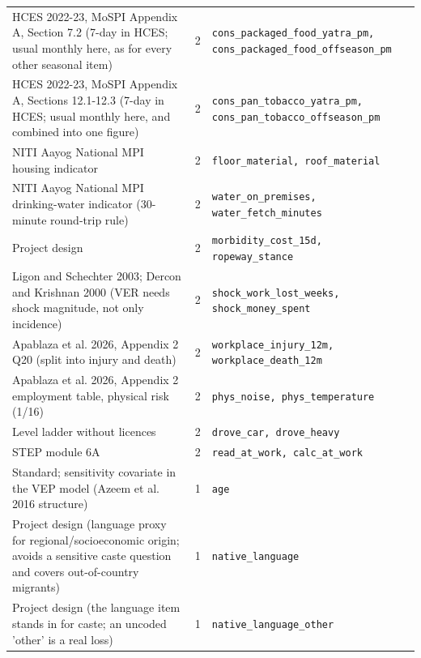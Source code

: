 \documentclass[9pt,a4paper,landscape]{article}
\begin{document}
\begin{longtable}{@{}p{9.5cm}p{1.2cm}p{12.5cm}@{}}
\scriptsize HCES 2022-23, MoSPI Appendix A, Section 7.2 (7-day in HCES; usual monthly here, as for every other seasonal item) & \scriptsize 2 & \scriptsize\texttt{cons\_packaged\_food\_yatra\_pm, cons\_packaged\_food\_offseason\_pm}\\
\scriptsize HCES 2022-23, MoSPI Appendix A, Sections 12.1-12.3 (7-day in HCES; usual monthly here, and combined into one figure) & \scriptsize 2 & \scriptsize\texttt{cons\_pan\_tobacco\_yatra\_pm, cons\_pan\_tobacco\_offseason\_pm}\\
\scriptsize NITI Aayog National MPI housing indicator & \scriptsize 2 & \scriptsize\texttt{floor\_material, roof\_material}\\
\scriptsize NITI Aayog National MPI drinking-water indicator (30-minute round-trip rule) & \scriptsize 2 & \scriptsize\texttt{water\_on\_premises, water\_fetch\_minutes}\\
\scriptsize Project design & \scriptsize 2 & \scriptsize\texttt{morbidity\_cost\_15d, ropeway\_stance}\\
\scriptsize Ligon and Schechter 2003; Dercon and Krishnan 2000 (VER needs shock magnitude, not only incidence) & \scriptsize 2 & \scriptsize\texttt{shock\_work\_lost\_weeks, shock\_money\_spent}\\
\scriptsize Apablaza et al. 2026, Appendix 2 Q20 (split into injury and death) & \scriptsize 2 & \scriptsize\texttt{workplace\_injury\_12m, workplace\_death\_12m}\\
\scriptsize Apablaza et al. 2026, Appendix 2 employment table, physical risk (1/16) & \scriptsize 2 & \scriptsize\texttt{phys\_noise, phys\_temperature}\\
\scriptsize Level ladder without licences & \scriptsize 2 & \scriptsize\texttt{drove\_car, drove\_heavy}\\
\scriptsize STEP module 6A & \scriptsize 2 & \scriptsize\texttt{read\_at\_work, calc\_at\_work}\\
\scriptsize Standard; sensitivity covariate in the VEP model (Azeem et al. 2016 structure) & \scriptsize 1 & \scriptsize\texttt{age}\\
\scriptsize Project design (language proxy for regional/socioeconomic origin; avoids a sensitive caste question and covers out-of-country migrants) & \scriptsize 1 & \scriptsize\texttt{native\_language}\\
\scriptsize Project design (the language item stands in for caste; an uncoded 'other' is a real loss) & \scriptsize 1 & \scriptsize\texttt{native\_language\_other}\\

\end{longtable}
\end{document}
